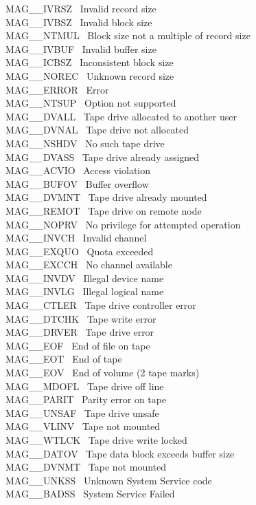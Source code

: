MAG\_\_IVRSZ  \dash\ Invalid record size \\
MAG\_\_IVBSZ  \dash\ Invalid block size \\
MAG\_\_NTMUL  \dash\ Block size not a multiple of record size \\
MAG\_\_IVBUF  \dash\ Invalid buffer size \\
MAG\_\_ICBSZ  \dash\ Inconsistent block size \\
MAG\_\_NOREC  \dash\ Unknown record size \\
MAG\_\_ERROR  \dash\ Error \\
MAG\_\_NTSUP  \dash\ Option not supported \\
MAG\_\_DVALL  \dash\ Tape drive allocated to another user \\
MAG\_\_DVNAL  \dash\ Tape drive not allocated \\
MAG\_\_NSHDV  \dash\ No such tape drive \\
MAG\_\_DVASS  \dash\ Tape drive already assigned \\
MAG\_\_ACVIO  \dash\ Access violation \\
MAG\_\_BUFOV  \dash\ Buffer overflow \\
MAG\_\_DVMNT  \dash\ Tape drive already mounted \\
MAG\_\_REMOT  \dash\ Tape drive on remote node \\
MAG\_\_NOPRV  \dash\ No privilege for attempted operation \\
MAG\_\_INVCH  \dash\ Invalid channel \\
MAG\_\_EXQUO  \dash\ Quota exceeded \\
MAG\_\_EXCCH  \dash\ No channel available \\
MAG\_\_INVDV  \dash\ Illegal device name \\
MAG\_\_INVLG  \dash\ Illegal logical name \\
MAG\_\_CTLER  \dash\ Tape drive controller error \\
MAG\_\_DTCHK  \dash\ Tape write error \\
MAG\_\_DRVER  \dash\ Tape drive error \\
MAG\_\_EOF    \dash\ End of file on tape \\
MAG\_\_EOT    \dash\ End of tape \\
MAG\_\_EOV    \dash\ End of volume (2 tape marks) \\
MAG\_\_MDOFL  \dash\ Tape drive off line \\
MAG\_\_PARIT  \dash\ Parity error on tape \\
MAG\_\_UNSAF  \dash\ Tape drive unsafe \\
MAG\_\_VLINV  \dash\ Tape not mounted \\
MAG\_\_WTLCK  \dash\ Tape drive write locked \\
MAG\_\_DATOV  \dash\ Tape data block exceeds buffer size \\
MAG\_\_DVNMT  \dash\ Tape not mounted \\
MAG\_\_UNKSS  \dash\ Unknown System Service code \\
MAG\_\_BADSS  \dash\ System Service Failed


